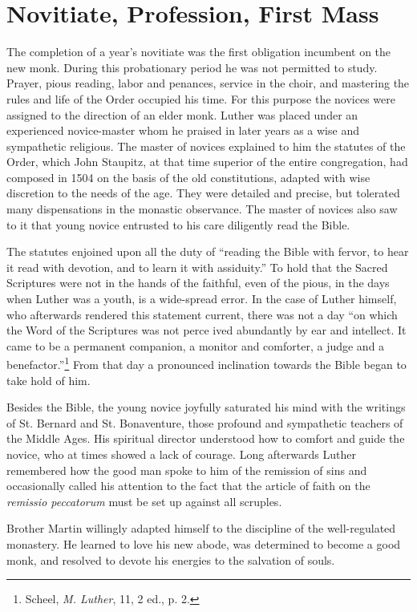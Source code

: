 \section{Novitiate, Profession, First Mass}
The completion of a year’s novitiate was the first obligation incumbent
on the new monk. During this probationary period he was
not permitted to study. Prayer, pious reading, labor and penances,
service in the choir, and mastering the rules and life of the Order
occupied his time. For this purpose the novices were assigned to the
direction of an elder monk. Luther was placed under an experienced
novice-master whom he praised in later years
as a wise and sympathetic religious. The master of novices explained
to him the statutes of the Order, which John Staupitz, at that time
superior of the entire congregation, had composed in 1504
on the basis of the old constitutions, adapted with wise discretion to
the needs of the age. They were detailed and precise, but tolerated many
dispensations in the monastic observance. The master of novices also saw to it that
young novice entrusted to his care diligently read the Bible.

The statutes enjoined upon all the duty of
“reading the Bible with fervor, to hear it read with devotion, and to learn it with assiduity.”
To hold that the Sacred Scriptures were not in the hands of the faithful, even of the pious, in the days
when Luther was a youth, is a wide-spread error. In the case of Luther himself, who afterwards
rendered this statement current, there was not a day “on which the Word of the Scriptures was not perce
ived abundantly by ear and intellect. It came to be a permanent companion,
a monitor and comforter, a judge and a benefactor.”\footnote{Scheel, \textit{M. Luther}, 11, 2 ed., p. 2.}
From that day a pronounced inclination towards the Bible began to take hold of him.

Besides the Bible, the young novice joyfully saturated his mind
with the writings of St. Bernard
and St. Bonaventure, those profound and sympathetic teachers of
the Middle Ages. His spiritual director understood how to comfort and guide the novice, who at
times showed a lack of courage. Long afterwards Luther remembered
how the good man spoke to him of the remission of sins and occasionally
called his attention to the fact that the article of faith on the
\textit{remissio peccatorum} must be set up against all scruples.

Brother Martin willingly adapted himself to the discipline of the
well-regulated monastery. He learned to love his new abode, was
determined to become a good monk, and resolved to devote his
energies to the salvation of souls.

